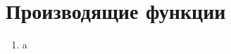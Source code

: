 \documentclass[12pt]{article}
\begin{document}
	\section{Производящие функции}
	\begin{enumerate}[label={\textbf{\arabic{section}.\arabic*}}]
		\item a
	\end{enumerate}
	\newpage
	
\end{document}
